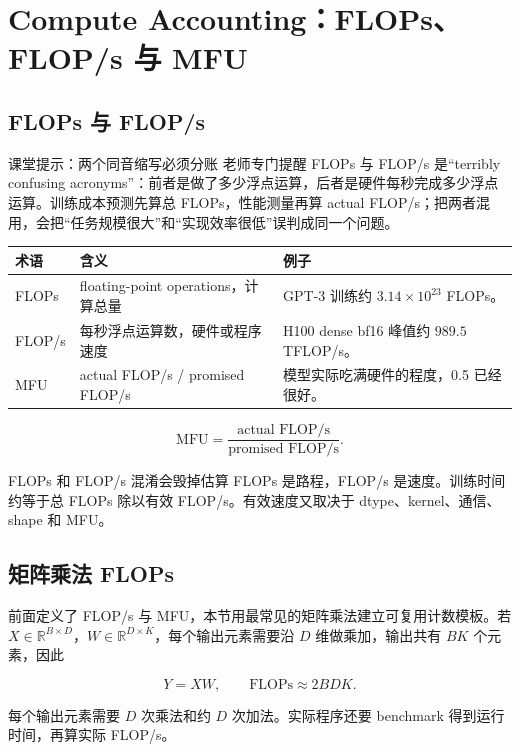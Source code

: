 \section{Compute Accounting：FLOPs、FLOP/s 与 MFU}

\subsection{FLOPs 与 FLOP/s}

\begin{knowledgebox}{课堂提示：两个同音缩写必须分账}
老师专门提醒 FLOPs 与 FLOP/s 是“terribly confusing acronyms”：前者是做了多少浮点运算，后者是硬件每秒完成多少浮点运算。训练成本预测先算总 FLOPs，性能测量再算 actual FLOP/s；把两者混用，会把“任务规模很大”和“实现效率很低”误判成同一个问题。
\end{knowledgebox}

\begin{longtable}{p{}p{}p{}}
\toprule
\textbf{术语} & \textbf{含义} & \textbf{例子} \\
\midrule
FLOPs & floating-point operations，计算总量 & GPT-3 训练约 \(3.14\times 10^{23}\) FLOPs。 \\
FLOP/s & 每秒浮点运算数，硬件或程序速度 & H100 dense bf16 峰值约 \(989.5\) TFLOP/s。 \\
MFU & actual FLOP/s / promised FLOP/s & 模型实际吃满硬件的程度，0.5 已经很好。 \\
\bottomrule
\end{longtable}

\[
\mathrm{MFU}=\frac{\text{actual FLOP/s}}{\text{promised FLOP/s}}.
\]

\begin{warningbox}{FLOPs 和 FLOP/s 混淆会毁掉估算}
FLOPs 是路程，FLOP/s 是速度。训练时间约等于总 FLOPs 除以有效 FLOP/s。有效速度又取决于 dtype、kernel、通信、shape 和 MFU。
\end{warningbox}

\subsection{矩阵乘法 FLOPs}

前面定义了 FLOP/s 与 MFU，本节用最常见的矩阵乘法建立可复用计数模板。若 \(X\in\mathbb{R}^{B\times D}\)，\(W\in\mathbb{R}^{D\times K}\)，每个输出元素需要沿 $D$ 维做乘加，输出共有 $BK$ 个元素，因此

\[
Y=XW,\qquad
\text{FLOPs}\approx 2BDK.
\]

每个输出元素需要 \(D\) 次乘法和约 \(D\) 次加法。实际程序还要 benchmark 得到运行时间，再算实际 FLOP/s。

